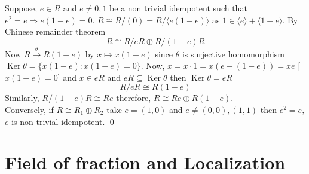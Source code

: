 \documentclass[11pt]{amsart}
\begin{document}
\proof Suppose, $e\in R$ and $e\neq 0,1$ be a non trivial idempotent such that $e^2=e \Rightarrow e(1-e)=0.$ $R\cong R/(0)=R/\langle e(1-e)\rangle$ as $1\in \langle e\rangle+\langle 1-e\rangle.$ By Chinese remainder theorem $$R\cong R/eR\oplus R/(1-e)R$$ Now $R\stackrel{\theta}{\longrightarrow } R(1-e)$ by $x\mapsto x(1-e)$ since $\theta$ is surjective homomorphism $\operatorname{Ker}\theta=\{x(1-e):x(1-e)=0\}.$ Now, $x=x\cdot 1=x(e+(1-e))=xe$ [$x(1-e)=0$] and $x\in eR$ and $eR\subseteq \operatorname{Ker}\theta$ then $\operatorname{Ker}\theta=eR$ $$R/eR\cong R(1-e)$$ Similarly, $R/(1-e)R\cong Re$ therefore, $R\cong Re\oplus R(1-e).$\\
Conversely, if $R\cong R_1\oplus R_2$ take $e=(1,0)$ and $e\neq (0,0),(1,1)$ then $e^2=e,$ $e$ is non trivial idempotent. \qed



\newpage
\section{Field of fraction and Localization}
\end{document}
